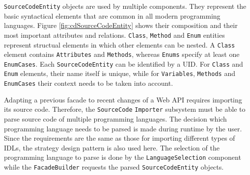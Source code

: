 \texttt{SourceCodeEntity} objects are used by multiple components. They represent the basic syntactical elements that are common in all modern programming languages. Figure \ref{fig:cdSourceCodeEntity} shows their composition and their most important attributes and relations. \texttt{Class}, \texttt{Method} and \texttt{Enum} entities represent structual elements in which other elements can be nested. A \texttt{Class} element contains \texttt{Attributes} and \texttt{Methods}, whereas \texttt{Enums} specify at least one \texttt{EnumCases}. Each \texttt{Source\-Code\-Entity} can be identified by a \ac{UID}. For \texttt{Class} and \texttt{Enum} elements, their name itself is unique, while for \texttt{Variables}, \texttt{Methods} and \texttt{EnumCases} their context needs to be taken into account.

\begin{figure}[!h]
\end{figure}

Adapting a previous facade to recent changes of a Web API requires importing its source code. Therefore, the \texttt{SourceCode} \texttt{Importer} subsystem must be able to parse source code of multiple programming languages. The decision which programming language needs to be parsed is made during runtime by the user. Since the requirements are the same as those for importing different types of \acp{IDL}, the strategy design pattern is also used here. The selection of the programming language to parse is done by the \texttt{Language\-Selection} component while the \texttt{Facade\-Builder} requests the parsed \texttt{Source\-Code\-Entity} objects.

